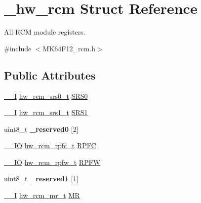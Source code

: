 \hypertarget{struct__hw__rcm}{}\section{\+\_\+hw\+\_\+rcm Struct Reference}
\label{struct__hw__rcm}


All R\+CM module registers.  




{\ttfamily \#include $<$M\+K64\+F12\+\_\+rcm.\+h$>$}

\subsection*{Public Attributes}
\begin{DoxyCompactItemize}
\item 
\hyperlink{core__sc300_8h_af63697ed9952cc71e1225efe205f6cd3}{\+\_\+\+\_\+I} \hyperlink{union__hw__rcm__srs0}{hw\+\_\+rcm\+\_\+srs0\+\_\+t} \hyperlink{struct__hw__rcm_af7f3aec73d3aa5fdd275fd25af4a265e}{S\+R\+S0}
\item 
\hyperlink{core__sc300_8h_af63697ed9952cc71e1225efe205f6cd3}{\+\_\+\+\_\+I} \hyperlink{union__hw__rcm__srs1}{hw\+\_\+rcm\+\_\+srs1\+\_\+t} \hyperlink{struct__hw__rcm_a5e0efd03b27f711dab85e4f3f18c4272}{S\+R\+S1}
\item 
uint8\+\_\+t {\bfseries \+\_\+reserved0} \mbox{[}2\mbox{]}\hypertarget{struct__hw__rcm_ac3ca0267815b3eb213a62fbf894a6917}{}\label{struct__hw__rcm_ac3ca0267815b3eb213a62fbf894a6917}

\item 
\hyperlink{core__sc300_8h_aec43007d9998a0a0e01faede4133d6be}{\+\_\+\+\_\+\+IO} \hyperlink{union__hw__rcm__rpfc}{hw\+\_\+rcm\+\_\+rpfc\+\_\+t} \hyperlink{struct__hw__rcm_a3c232f51a7a96dd5a78a09cd823f4495}{R\+P\+FC}
\item 
\hyperlink{core__sc300_8h_aec43007d9998a0a0e01faede4133d6be}{\+\_\+\+\_\+\+IO} \hyperlink{union__hw__rcm__rpfw}{hw\+\_\+rcm\+\_\+rpfw\+\_\+t} \hyperlink{struct__hw__rcm_a348d2ee757bbd9f7fd1dc5bed4bc3511}{R\+P\+FW}
\item 
uint8\+\_\+t {\bfseries \+\_\+reserved1} \mbox{[}1\mbox{]}\hypertarget{struct__hw__rcm_a90851d59074b7f228c25cc852729d874}{}\label{struct__hw__rcm_a90851d59074b7f228c25cc852729d874}

\item 
\hyperlink{core__sc300_8h_af63697ed9952cc71e1225efe205f6cd3}{\+\_\+\+\_\+I} \hyperlink{union__hw__rcm__mr}{hw\+\_\+rcm\+\_\+mr\+\_\+t} \hyperlink{struct__hw__rcm_ab697d921c1115f1dbfc9c165e0b5de6f}{MR}
\end{DoxyCompactItemize}


